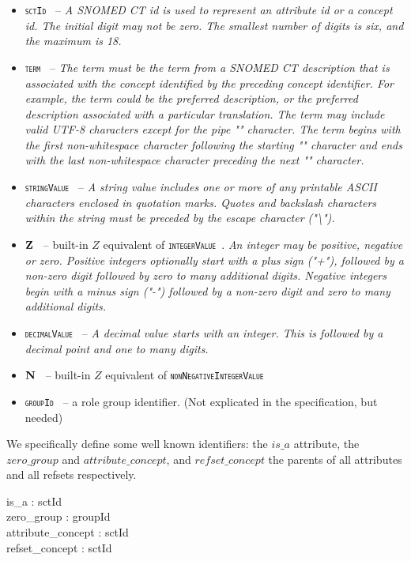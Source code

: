 \documentclass{article}
\def\spec#1{{\tt \small \textsc{{#1}} }}
\def\desc#1{{\small \textsl{{#1}} }}
\begin{document}
\begin{itemize}[noitemsep]
\item \spec{sctId} -- \desc{A SNOMED CT id is used to represent an attribute id or a concept id.  The initial digit may not be zero. The smallest number of digits is six, and the maximum is 18.}
\item \spec{term} --  \desc{The term must be the term from a SNOMED CT description that is associated with the concept identified by the preceding concept identifier. For example, the term could be the preferred description, or the preferred description associated with a particular translation. The term may include valid UTF-8 characters except for the pipe "\textbar" character. The term begins with the first non-whitespace character following the starting "\textbar" character and ends with the last non-whitespace character preceding the next "\textbar" character.}
\item \spec{stringValue} -- \desc{A string value includes one or more of any printable ASCII characters enclosed in quotation marks. Quotes and backslash characters within the string must be preceded by the escape character ("\textbackslash").}
\item \spec{${\mathbf{Z}}$} -- built-in $Z$ equivalent of \spec{integerValue}. \desc{An integer may be positive, negative or zero. Positive integers optionally start with a plus sign ("+"), followed by a non-zero digit followed by zero to many additional digits. Negative integers begin with a minus sign ("-") followed by a non-zero digit and zero to many additional digits.}
\item \spec{decimalValue} --  \desc{A decimal value starts with an integer. This is followed by a decimal point and one to many digits.}
\item \spec{${\mathbf{N}}$} -- built-in $Z$ equivalent of \spec{nonNegativeIntegerValue}
\item \spec{groupId} -- a role group identifier.  (Not explicated in the specification, but needed)
\end{itemize}

\begin{zed}
\end{zed}


We specifically define some well known identifiers: the $is\_a$ attribute, the $zero\_group$ and  $attribute\_concept$, and $refset\_concept$ the parents of all attributes and all refsets respectively.
\begin{axdef}
is\_a : sctId \\
zero\_group : groupId \\
attribute\_concept : sctId \\
refset\_concept : sctId
\end{axdef}
\end{document}
